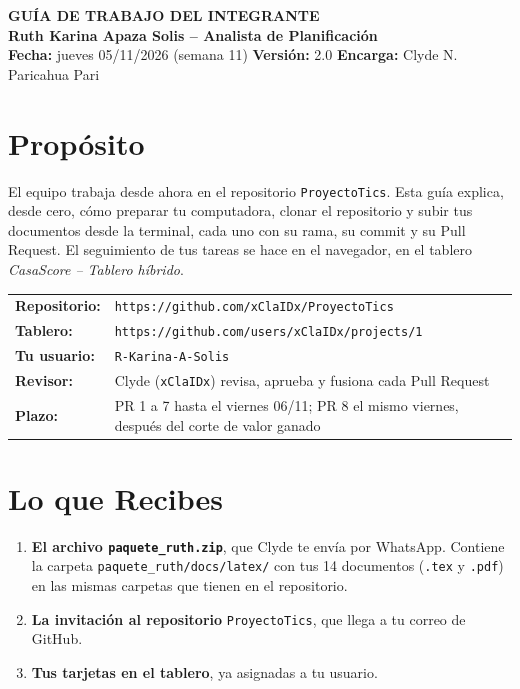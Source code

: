 \documentclass[11pt,a4paper]{article}
\begin{document}
\shorthandoff{<>}
\begin{center}
    {\Large \textbf{\textcolor{AzulUNA}{GUÍA DE TRABAJO DEL INTEGRANTE}}}\\[3pt]
    {\normalsize \textbf{Ruth Karina Apaza Solis -- Analista de Planificación}}\\[4pt]
    \footnotesize \textbf{Fecha:} jueves 05/11/2026 (semana 11) \quad \textbar\quad \textbf{Versión:} 2.0 \quad \textbar\quad \textbf{Encarga:} Clyde N. Paricahua Pari
\end{center}

\vspace{0.1cm}

\section{Propósito}
El equipo trabaja desde ahora en el repositorio \texttt{ProyectoTics}. Esta guía explica, desde cero, cómo preparar tu computadora, clonar el repositorio y subir tus documentos desde la terminal, cada uno con su rama, su commit y su Pull Request. El seguimiento de tus tareas se hace en el navegador, en el tablero \textit{CasaScore -- Tablero híbrido}.

\vspace{0.1cm}
\noindent\begin{tabularx}{\textwidth}{@{}P{3.6cm} L@{}}
\toprule
\textbf{Repositorio:} & \nolinkurl{https://github.com/xClaIDx/ProyectoTics} \\
\textbf{Tablero:} & \nolinkurl{https://github.com/users/xClaIDx/projects/1} \\
\textbf{Tu usuario:} & \texttt{R-Karina-A-Solis} \\
\textbf{Revisor:} & Clyde (\texttt{xClaIDx}) revisa, aprueba y fusiona cada Pull Request \\
\textbf{Plazo:} & PR 1 a 7 hasta el viernes 06/11; PR 8 el mismo viernes, después del corte de valor ganado \\
\bottomrule
\end{tabularx}

\section{Lo que Recibes}
\begin{enumerate}[leftmargin=*]
    \item \textbf{El archivo \texttt{paquete\_ruth.zip}}, que Clyde te envía por WhatsApp. Contiene la carpeta \nolinkurl{paquete_ruth/docs/latex/} con tus 14 documentos (\texttt{.tex} y \texttt{.pdf}) en las mismas carpetas que tienen en el repositorio.
    \item \textbf{La invitación al repositorio} \texttt{ProyectoTics}, que llega a tu correo de GitHub.
    \item \textbf{Tus tarjetas en el tablero}, ya asignadas a tu usuario.
\end{enumerate}
\end{document}
